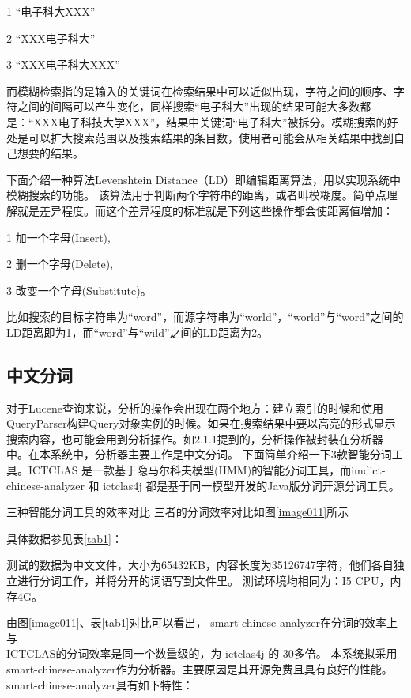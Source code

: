 1 “电子科大XXX”

2 “XXX电子科大”

3 “XXX电子科大XXX”

而模糊检索指的是输入的关键词在检索结果中可以近似出现，字符之间的顺序、字符之间的间隔可以产生变化，同样搜索“电子科大”出现的结果可能大多数都是：“XXX电子科技大学XXX”，结果中关键词“电子科大”被拆分。模糊搜索的好处是可以扩大搜索范围以及搜索结果的条目数，使用者可能会从相关结果中找到自己想要的结果。

下面介绍一种算法Levenshtein Distance（LD）即编辑距离算法，用以实现系统中模糊搜索的功能。
该算法用于判断两个字符串的距离，或者叫模糊度。简单点理解就是差异程度。而这个差异程度的标准就是下列这些操作都会使距离值增加：

1 加一个字母(Insert),

2 删一个字母(Delete),

3 改变一个字母(Substitute)。

比如搜索的目标字符串为“word”，而源字符串为“world”，“world”与“word”之间的LD距离即为1，而“word”与“wild”之间的LD距离为2。

\subsection{中文分词}
对于Lucene查询来说，分析的操作会出现在两个地方：建立索引的时候和使用QueryParser构建Query对象实例的时候。如果在搜索结果中要以高亮的形式显示搜索内容，也可能会用到分析操作。如2.1.1提到的，分析操作被封装在分析器中。在本系统中，分析器主要工作是中文分词。
下面简单介绍一下3款智能分词工具。ICTCLAS 是一款基于隐马尔科夫模型(HMM)的智能分词工具，而imdict-chinese-analyzer 和 ictclas4j 都是基于同一模型开发的Java版分词开源分词工具。


三种智能分词工具的效率对比
三者的分词效率对比如图\ref{image011}所示

具体数据参见表\ref{tab1}：

测试的数据为中文文件，大小为65432KB，内容长度为35126747字符，他们各自独立进行分词工作，并将分开的词语写到文件里。
测试环境均相同为：I5 CPU，内存4G。

由图\ref{image011}、表\ref{tab1}对比可以看出， smart-chinese-analyzer在分词的效率上与\\ICTCLAS的分词效率是同一个数量级的，为 ictclas4j 的 30多倍。
本系统拟采用smart-chinese-analyzer作为分析器。主要原因是其开源免费且具有良好的性能。smart-chinese-analyzer具有如下特性：

